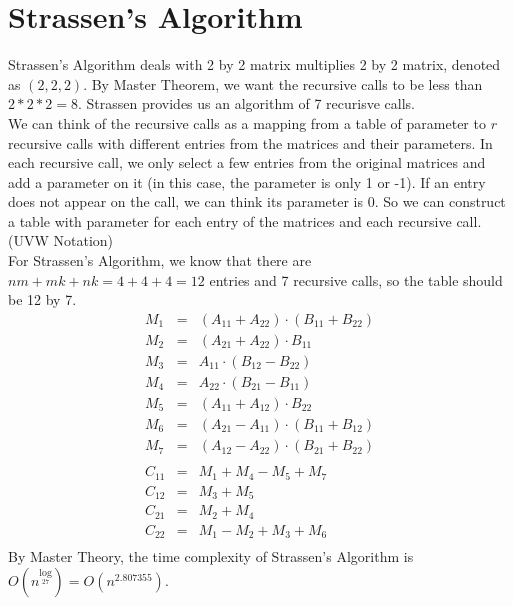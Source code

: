 \documentclass{article}
\begin{document}
\section{Strassen's Algorithm}
Strassen's Algorithm deals with 2 by 2 matrix multiplies 2 by 2 matrix, denoted as $(2,2,2)$. By Master Theorem, we want the recursive calls to be less than $2*2*2 = 8$. Strassen provides us an algorithm of 7 recurisve calls.\\
We can think of the recursive calls as a mapping from a table of parameter to $r$ recursive calls with different entries from the matrices and their parameters. In each recursive call, we only select a few entries from the original matrices and add a parameter on it (in this case, the parameter is only 1 or -1). If an entry does not appear on the call, we can think its parameter is 0. So we can construct a table with parameter for each entry of the matrices and each recursive call. (UVW Notation)\\
For Strassen's Algorithm, we know that there are $nm+mk+nk = 4+4+4 = 12$ entries and 7 recursive calls, so the table should be 12 by 7.
\begin{eqnarray*}
M_1 &=& (A_{11} + A_{22}) \cdot (B_{11} + B_{22}) \\
M_2 &=& (A_{21} + A_{22})\cdot  B_{11} \\
M_3 &=& A_{11}\cdot(B_{12} - B_{22}) \\
M_4 &=&        A_{22}\cdot (B_{21} -B_{11}) \\
M_5 &=& (A_{11}+ A_{12}) \cdot B_{22} \\
M_6 &=& (A_{21} - A_{11}) \cdot (B_{11} + B_{12}) \\
M_7 &=& (A_{12}- A_{22}) \cdot (B_{21} + B_{22}) \\\\
C_{11} &=& M_1 + M_4 - M_5 + M_7 \\
C_{12} &=& M_3 + M_5 \\
C_{21} &=& M_2 + M_4 \\
C_{22} &=& M_1 - M_2 + M_3 + M_6\\
\end{eqnarray*}
By Master Theory, the time complexity of Strassen's Algorithm is $O(n^{\log\limits_27}) = O(n^{2.807355})$.\\
\end{document}
